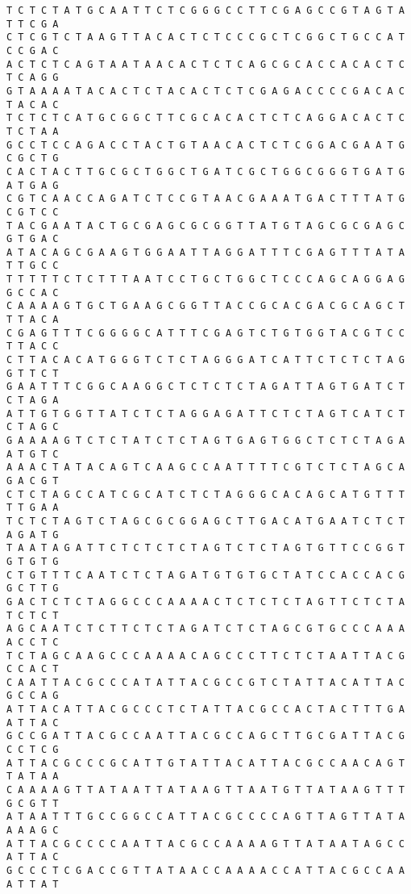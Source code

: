 \documentclass[11pt]{article}
\begin{document}
\begin{Verbatim}[commandchars=\\\{\}]
T C T C T A T G C A A T T C T C G G G C C T T C G A G C C G T A G T A T T C G A
C T C G T C T A A G T T A C A C T C T C C C G C T C G G C T G C C A T C C G A C
A C T C T C A G T A A T A A C A C T C T C A G C G C A C C A C A C T C T C A G G
G T A A A A T A C A C T C T A C A C T C T C G A G A C C C C G A C A C T A C A C
T C T C T C A T G C G G C T T C G C A C A C T C T C A G G A C A C T C T C T A A
G C C T C C A G A C C T A C T G T A A C A C T C T C G G A C G A A T G C G C T G
C A C T A C T T G C G C T G G C T G A T C G C T G G C G G G T G A T G A T G A G
C G T C A A C C A G A T C T C C G T A A C G A A A T G A C T T T A T G C G T C C
T A C G A A T A C T G C G A G C G C G G T T A T G T A G C G C G A G C G T G A C
A T A C A G C G A A G T G G A A T T A G G A T T T C G A G T T T A T A T T G C C
T T T T T C T C T T T A A T C C T G C T G G C T C C C A G C A G G A G G C C A C
C A A A A G T G C T G A A G C G G T T A C C G C A C G A C G C A G C T T T A C A
C G A G T T T C G G G G C A T T T C G A G T C T G T G G T A C G T C C T T A C C
C T T A C A C A T G G G T C T C T A G G G A T C A T T C T C T C T A G G T T C T
G A A T T T C G G C A A G G C T C T C T C T A G A T T A G T G A T C T C T A G A
A T T G T G G T T A T C T C T A G G A G A T T C T C T A G T C A T C T C T A G C
G A A A A G T C T C T A T C T C T A G T G A G T G G C T C T C T A G A A T G T C
A A A C T A T A C A G T C A A G C C A A T T T T C G T C T C T A G C A G A C G T
C T C T A G C C A T C G C A T C T C T A G G G C A C A G C A T G T T T T T G A A
T C T C T A G T C T A G C G C G G A G C T T G A C A T G A A T C T C T A G A T G
T A A T A G A T T C T C T C T C T A G T C T C T A G T G T T C C G G T G T G T G
C T G T T T C A A T C T C T A G A T G T G T G C T A T C C A C C A C G G C T T G
G A C T C T C T A G G C C C A A A A C T C T C T C T A G T T C T C T A T C T C T
A G C A A T C T C T T C T C T A G A T C T C T A G C G T G C C C A A A A C C T C
T C T A G C A A G C C C A A A A C A G C C C T T C T C T A A T T A C G C C A C T
C A A T T A C G C C C A T A T T A C G C C G T C T A T T A C A T T A C G C C A G
A T T A C A T T A C G C C C T C T A T T A C G C C A C T A C T T T G A A T T A C
G C C G A T T A C G C C A A T T A C G C C A G C T T G C G A T T A C G C C T C G
A T T A C G C C C G C A T T G T A T T A C A T T A C G C C A A C A G T T A T A A
C A A A A G T T A T A A T T A T A A G T T A A T G T T A T A A G T T T G C G T T
A T A A T T T G C C G G C C A T T A C G C C C C A G T T A G T T A T A A A A G C
A T T A C G C C C C A A T T A C G C C A A A A G T T A T A A T A G C C A T T A C
G C C C T C G A C C G T T A T A A C C A A A A C C A T T A C G C C A A A T T A T

\end{Verbatim}
\end{document}
